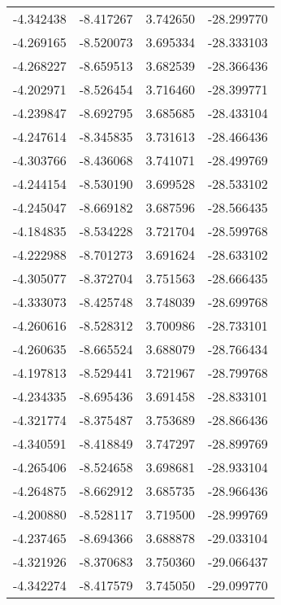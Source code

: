 \begin{tabular}{rrrr}
       -4.342438 &        -8.417267 &    3.742650 & -28.299770 \\
       -4.269165 &        -8.520073 &    3.695334 & -28.333103 \\
       -4.268227 &        -8.659513 &    3.682539 & -28.366436 \\
       -4.202971 &        -8.526454 &    3.716460 & -28.399771 \\
       -4.239847 &        -8.692795 &    3.685685 & -28.433104 \\
       -4.247614 &        -8.345835 &    3.731613 & -28.466436 \\
       -4.303766 &        -8.436068 &    3.741071 & -28.499769 \\
       -4.244154 &        -8.530190 &    3.699528 & -28.533102 \\
       -4.245047 &        -8.669182 &    3.687596 & -28.566435 \\
       -4.184835 &        -8.534228 &    3.721704 & -28.599768 \\
       -4.222988 &        -8.701273 &    3.691624 & -28.633102 \\
       -4.305077 &        -8.372704 &    3.751563 & -28.666435 \\
       -4.333073 &        -8.425748 &    3.748039 & -28.699768 \\
       -4.260616 &        -8.528312 &    3.700986 & -28.733101 \\
       -4.260635 &        -8.665524 &    3.688079 & -28.766434 \\
       -4.197813 &        -8.529441 &    3.721967 & -28.799768 \\
       -4.234335 &        -8.695436 &    3.691458 & -28.833101 \\
       -4.321774 &        -8.375487 &    3.753689 & -28.866436 \\
       -4.340591 &        -8.418849 &    3.747297 & -28.899769 \\
       -4.265406 &        -8.524658 &    3.698681 & -28.933104 \\
       -4.264875 &        -8.662912 &    3.685735 & -28.966436 \\
       -4.200880 &        -8.528117 &    3.719500 & -28.999769 \\
       -4.237465 &        -8.694366 &    3.688878 & -29.033104 \\
       -4.321926 &        -8.370683 &    3.750360 & -29.066437 \\
       -4.342274 &        -8.417579 &    3.745050 & -29.099770 \\

\end{tabular}
